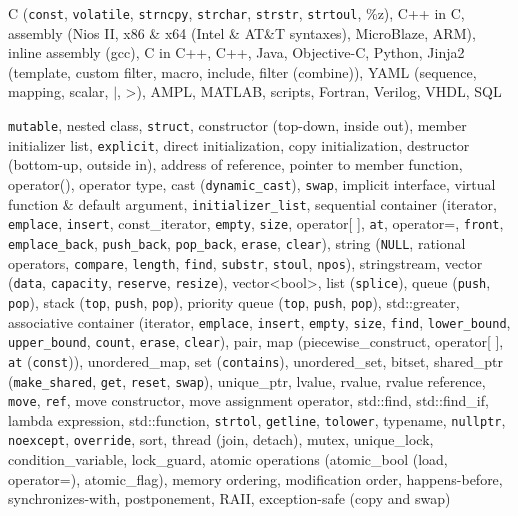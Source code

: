 \documentclass[letterpaper,11pt]{article}
\begin{document}
\begin{description}
\setlength{\itemindent}{-0.1in}

\item[Programming Languages:] C ({\tt const}, {\tt volatile}, {\tt strncpy}, {\tt strchar}, {\tt strstr}, {\tt strtoul}, \%z), C++ in C,
assembly (Nios II, x86 \& x64 (Intel \& AT\&T syntaxes), MicroBlaze, ARM),
inline assembly (gcc), C in C++,
%
C++,
%
Java, Objective-C,
%
Python,
%
Jinja2 (template, custom filter, macro, include, filter (combine)), YAML (sequence, mapping, scalar, $|$, \textgreater),
AMPL, MATLAB,
%
scripts,
%
Fortran, Verilog, VHDL, SQL %

\item[C++:] {\tt mutable}, nested class,
{\tt struct}, constructor (top-down, inside out), member initializer list, {\tt explicit}, direct initialization, copy initialization,
destructor (bottom-up, outside in), address of reference, pointer to member function, operator(), operator type,
cast ({\tt dynamic\_cast}), {\tt swap},
implicit interface, virtual function \& default argument, {\tt initializer\_list},
%
sequential container (iterator, {\tt emplace}, {\tt insert}, const\_iterator,
{\tt empty}, {\tt size}, operator[ ], {\tt at}, operator=, {\tt front}, {\tt emplace\_back},
{\tt push\_back}, {\tt pop\_back}, {\tt erase}, {\tt clear}),
%
string ({\tt NULL}, rational operators, {\tt compare}, {\tt length}, {\tt find}, {\tt substr}, {\tt stoul}, {\tt npos}), stringstream,
%
vector ({\tt data}, {\tt capacity}, {\tt reserve}, {\tt resize}), vector\textless bool\textgreater,
list ({\tt splice}),
queue ({\tt push}, {\tt pop}), stack ({\tt top}, {\tt push}, {\tt pop}),
priority queue ({\tt top}, {\tt push}, {\tt pop}), std::greater,
%
associative container (iterator, {\tt emplace}, {\tt insert}, {\tt empty}, {\tt size},
{\tt find}, {\tt lower\_bound}, {\tt upper\_bound},
{\tt count}, {\tt erase}, {\tt clear}),
%
pair, map (piecewise\_construct, operator[ ], {\tt at} ({\tt const})), unordered\_map, set ({\tt contains}), unordered\_set,
%
bitset,
%
shared\_ptr ({\tt make\_shared}, {\tt get}, {\tt reset}, {\tt swap}), unique\_ptr,
lvalue, rvalue, rvalue reference, {\tt move}, {\tt ref}, move constructor, move assignment operator,
%
std::find, std::find\_if, lambda expression, std::function, {\tt strtol}, {\tt getline}, {\tt tolower},
typename, {\tt nullptr}, {\tt noexcept}, {\tt override},
sort,
%
thread (join, detach),
mutex, unique\_lock, condition\_variable, lock\_guard,
atomic operations (atomic\_bool (load, operator=), atomic\_flag), memory ordering, modification order, happens-before, synchronizes-with,
%
postponement, RAII, exception-safe (copy and swap)


\end{description}
\end{document}
